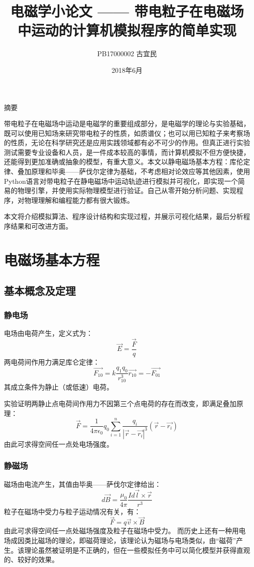 \documentclass[UTF-8,cs4size]{ctexart}
\title{电磁学小论文 —— 带电粒子在电磁场中运动的计算机模拟程序的简单实现}
\author{PB17000002  古宜民}
\date{2018年6月}
\begin{document}
 \normalsize


\maketitle
\begin{center}
	摘要
\end{center}

带电粒子在电磁场中运动是电磁学的重要组成部分，是电磁学的理论与实验基础，既可以使用已知场来研究带电粒子的性质，如质谱仪；也可以用已知粒子来考察场的性质，无论在科学研究还是应用实践领域都有必不可少的作用。但真正进行实验测试需要专业设备和人员，是一件成本较高的事情，而计算机模拟不但方便快捷，还能得到更加准确或抽象的模型，有重大意义。本文以静电磁场基本方程：库伦定律、叠加原理和毕奥——萨伐尔定律为基础，不考虑相对论效应等其他因素，使用Python语言对带电粒子在静电磁场中运动轨迹进行模拟并可视化，即实现一个简易的物理引擎，并使用实际物理模型进行验证。自己从零开始分析问题、实现程序，对物理理解和编程能力都有很大锻炼。


本文将介绍模拟算法、程序设计结构和实现过程，并展示可视化结果，最后分析程序结果和可改进方面。
\clearpage
\tableofcontents
\clearpage
\section{电磁场基本方程}
\subsection{基本概念及定理}
\subsubsection{静电场}
电场由电荷产生，定义式为：
\begin{equation}
	\vec{E} = \frac{\vec{F}}{q}
\end{equation}
两电荷间作用力满足库仑定律：
\begin{equation}
	\vec{F_{10}} = k\frac{q_1q_0}{r_{10}^3}\vec{r_{10}} = - \vec{F_{01}}
\end{equation}
其成立条件为静止（或低速）电荷。


实验证明两静止点电荷间作用力不因第三个点电荷的存在而改变，即满足叠加原理：
\begin{equation}
	\vec{F} = \frac1{4\pi\epsilon_0}q_0\sum_{i=1}^{n} \frac{q_i}{|\vec{r} - \vec{r_i}|^3}(\vec{r} - \vec{r_i})
\end{equation}
由此可求得空间任一点处电场强度。
\subsubsection{静磁场}
磁场由电流产生，其值由毕奥——萨伐尔定律给出：
\begin{equation}
	d\vec{B} = \frac{\mu_0}{4\pi}\frac{Id\vec{l}\times\vec{r}}{r^3}
\end{equation}
粒子在磁场中受力与粒子运动情况有关，有：
\begin{equation}
	\vec{F} = q\vec{v}\times\vec{B}
\end{equation}
由此可求得空间任一点处磁场强度及粒子在磁场中受力。
而历史上还有一种用电场成因类比磁场的理论，即磁荷理论，该理论认为磁场与电场类似，由“磁荷”产生。该理论虽然被证明是不正确的，但在一些模拟任务中可以简化模型并获得直观的、较好的效果。
\end{document}
